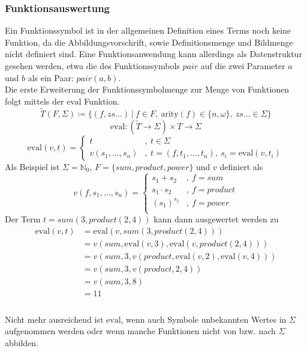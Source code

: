 \documentclass{article}
\begin{document}
\subsubsection{Funktionsauswertung}
Ein Funktionssymbol ist in der allgemeinen Definition eines Terms noch keine Funktion, da die Abbildungsvorschrift, sowie Definitionsmenge und Bildmenge nicht definiert sind. Eine Funktionsanwendung kann allerdings als Datenstruktur gesehen werden, etwa die des Funktionssymbols $pair$ auf die zwei Parameter $a$ und $b$ als ein Paar: $pair(a, b)$.\\
Die erste Erweiterung der Funktionssymbolmenge zur Menge von Funktionen folgt mittels der $\mathrm{eval}$ Funktion.
$$\tilde{T}(F, \Sigma) \coloneqq \{
(f, zs...)
~|
~f \in F,
~\mathrm{arity}(f) \in \{n, \omega\},
~zs... \in \Sigma
\}$$
$$\mathrm{eval} \colon (\tilde{T} \rightarrow \Sigma) \times T \rightarrow \Sigma$$
$$\mathrm{eval}(v, t) = \begin{cases} 
            t &,~ t\in \Sigma \\
            v(s_1, \dots, s_n) &,~ t = (f, t_1, \dots , t_n), ~s_i = \mathrm{eval}(v, t_i)
            \end{cases}$$
Als Beispiel ist $\Sigma = \mathbb{N}_0$, $F = \{sum, product, power\}$ und $v$ definiert als
$$v(f, s_1, \dots, s_n) = \begin{cases}
s_1 + s_2 &,~ f = sum\\
s_1 \cdot s_2 &,~ f = product\\
(s_1)^{s_2} &,~ f = power\\
\end{cases}$$
Der Term $t = sum(3, product(2, 4))$ kann dann ausgewertet werden zu 
\begin{equation}
    \begin{split}
    \mathrm{eval}(v, t) &= \mathrm{eval}(v, sum(3, product(2, 4))) \\
    &= v(sum, \mathrm{eval}(v, 3), \mathrm{eval}(v, product(2, 4))) \\
    &= v(sum, 3, v(product, \mathrm{eval}(v, 2), \mathrm{eval}(v, 4))) \\
    &= v(sum, 3, v(product, 2, 4)) \\
    &= v(sum, 3, 8) \\
    &= 11 \\
    \end{split}
\end{equation}
\\
Nicht mehr ausreichend ist $\mathrm{eval}$, wenn auch Symbole unbekannten Wertes in $\Sigma$ aufgenommen werden oder wenn manche Funktionen nicht von bzw. nach $\Sigma$ abbilden. 
\end{document}
